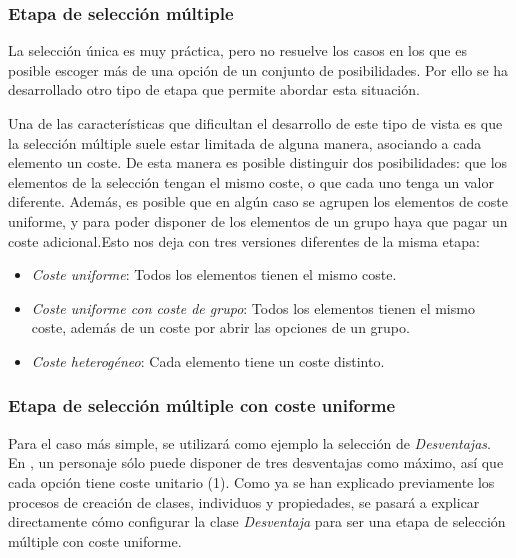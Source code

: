 \subsubsection{Etapa de selección múltiple}
La selección única es muy práctica, pero no resuelve los casos en los que es posible escoger más de una opción 
de un conjunto de posibilidades. Por ello se ha desarrollado otro tipo de etapa que permite abordar esta situación.\medskip

Una de las características que dificultan el desarrollo de este tipo de vista es que la selección múltiple suele estar 
limitada de alguna manera, asociando a cada elemento un coste. De esta manera es posible distinguir dos posibilidades: 
que los elementos de la selección tengan el mismo coste, o que cada uno tenga un valor diferente. Además, es posible que 
en algún caso se agrupen los elementos de coste uniforme, y para poder disponer de los elementos de un grupo haya que pagar 
un coste adicional.Esto nos deja con tres versiones diferentes de la misma etapa: 

\begin{itemize}
    \item \textit{Coste uniforme}: Todos los elementos tienen el mismo coste.
    \item \textit{Coste uniforme con coste de grupo}: Todos los elementos tienen el mismo coste, además de un coste por 
    abrir las opciones de un grupo.
    \item \textit{Coste heterogéneo}: Cada elemento tiene un coste distinto.
\end{itemize}

\subsubsection{Etapa de selección múltiple con coste uniforme}
Para el caso más simple, se utilizará como ejemplo la selección de \textit{Desventajas}. En \anima, un personaje sólo 
puede disponer de tres desventajas como máximo, así que cada opción tiene coste unitario (1). Como ya se han explicado 
previamente los procesos de creación de clases, individuos y propiedades, se pasará a explicar directamente cómo 
configurar la clase \textit{Desventaja} para ser una etapa de selección múltiple con coste uniforme.

